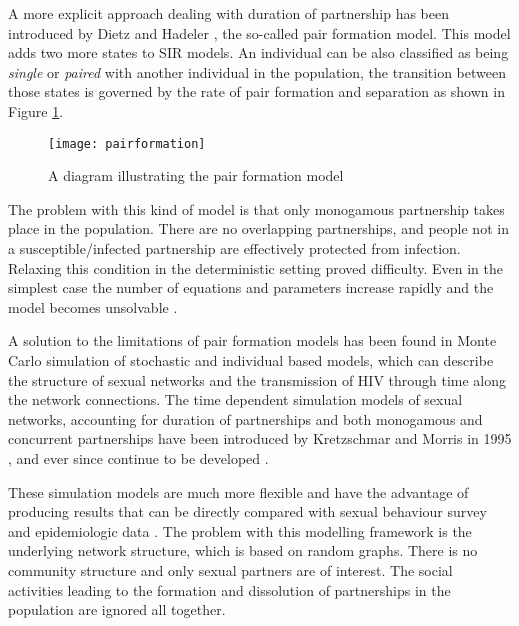 A more explicit approach dealing with duration of partnership has been introduced by
Dietz and Hadeler \cite{Dietz1988a}, the so-called pair formation model. This model adds
two more states to SIR models. An individual can be also classified as being
\emph{single} or \emph{paired} with another individual in the population, the transition
between those states is governed by the rate of pair formation and separation as shown in
Figure \ref{pairformation}.
\begin{figure}[h]
\begin{center}
\texttt{[image: pairformation]}
\caption{A diagram illustrating the pair formation model} \label{pairformation}
\end{center}
\end{figure}

The problem with this kind of model is that only monogamous partnership takes place in
the population. There are no overlapping partnerships, and people not in a
susceptible/infected partnership are effectively protected from infection. Relaxing this
condition in the deterministic setting proved difficulty. Even in the simplest case the
number of equations and parameters increase rapidly and the model becomes unsolvable
\cite{Kretzschmar2000}.

A solution to the limitations of pair formation models has been found in Monte Carlo
simulation of stochastic and individual based models, which can describe the structure of
sexual networks and the transmission of HIV through time along the network connections.
The time dependent simulation models of sexual networks, accounting for duration of
partnerships and both monogamous and concurrent partnerships have been introduced by
Kretzschmar and Morris in 1995 \cite{Kretschmar1996,Morris1995}, and ever since continue
to be developed \cite{morris1997,morrism1997,Kretzschmar2000}.

These simulation models are much more flexible and have the advantage of producing
results that can be directly compared with sexual behaviour survey and epidemiologic data
\cite{Kretzschmar2000}. The problem with this modelling framework is the underlying
network structure, which is based on random graphs. There is no community structure and
only sexual partners are of interest. The social activities leading to the formation and
dissolution of partnerships in the population are ignored all together.

